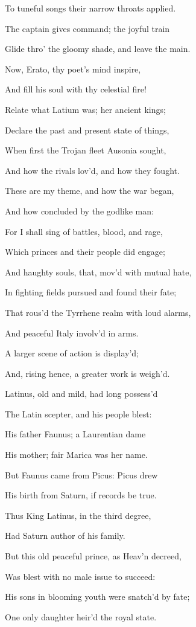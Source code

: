 To tuneful songs their narrow throats applied.

The captain gives command; the joyful train

Glide thro’ the gloomy shade, and leave the main.

Now, Erato, thy poet’s mind inspire,

And fill his soul with thy celestial fire!

Relate what Latium was; her ancient kings;

Declare the past and present state of things,

When first the Trojan fleet Ausonia sought,

And how the rivals lov’d, and how they fought.

These are my theme, and how the war began,

And how concluded by the godlike man:

For I shall sing of battles, blood, and rage,

Which princes and their people did engage;

And haughty souls, that, mov’d with mutual hate,

In fighting fields pursued and found their fate;

That rous’d the Tyrrhene realm with loud alarms,

And peaceful Italy involv’d in arms.

A larger scene of action is display’d;

And, rising hence, a greater work is weigh’d.

Latinus, old and mild, had long possess’d

The Latin scepter, and his people blest:

His father Faunus; a Laurentian dame

His mother; fair Marica was her name.

But Faunus came from Picus: Picus drew

His birth from Saturn, if records be true.

Thus King Latinus, in the third degree,

Had Saturn author of his family.

But this old peaceful prince, as Heav’n decreed,

Was blest with no male issue to succeed:

His sons in blooming youth were snatch’d by fate;

One only daughter heir’d the royal state.

